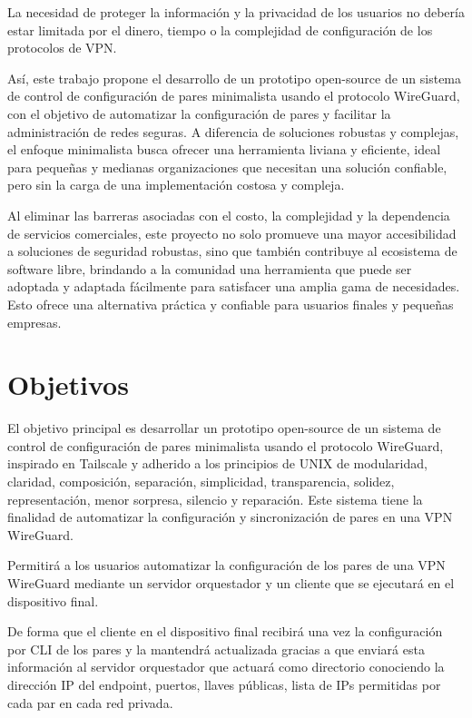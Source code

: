 \documentclass[letterpaper,12pt,oneside]{article}
\begin{document}
La necesidad de proteger la información y la privacidad de los usuarios no debería estar limitada por el dinero, tiempo o la complejidad de configuración de los protocolos de VPN.

Así, este trabajo propone el desarrollo de un prototipo open-source de un sistema de control de configuración de pares minimalista usando el protocolo WireGuard, con el objetivo de automatizar la configuración de pares y facilitar la administración de redes seguras. A diferencia de soluciones robustas y complejas, el enfoque minimalista busca ofrecer una herramienta liviana y eficiente, ideal para pequeñas y medianas organizaciones que necesitan una solución confiable, pero sin la carga de una implementación costosa y compleja.

Al eliminar las barreras asociadas con el costo, la complejidad y la dependencia de servicios comerciales, este proyecto no solo promueve una mayor accesibilidad a soluciones de seguridad robustas, sino que también contribuye al ecosistema de software libre, brindando a la comunidad una herramienta que puede ser adoptada y adaptada fácilmente para satisfacer una amplia gama de necesidades. Esto ofrece una alternativa práctica y confiable para usuarios finales y pequeñas empresas.

\section{Objetivos}

El objetivo principal es desarrollar un prototipo open-source de un sistema de control de configuración de pares minimalista usando el protocolo WireGuard, inspirado en Tailscale y adherido a los principios de UNIX de modularidad, claridad, composición, separación, simplicidad, transparencia, solidez, representación, menor sorpresa, silencio y reparación. Este sistema tiene la finalidad de automatizar la configuración y sincronización de pares en una VPN WireGuard.

Permitirá a los usuarios automatizar la configuración de los pares de una VPN WireGuard mediante un servidor orquestador y un cliente que se ejecutará en el dispositivo final.

De forma que el cliente en el dispositivo final recibirá una vez la configuración por CLI de los pares y la mantendrá actualizada gracias a que enviará esta información al servidor orquestador que actuará como directorio conociendo la dirección IP del endpoint, puertos, llaves públicas, lista de IPs permitidas por cada par en cada red privada.
\end{document}
